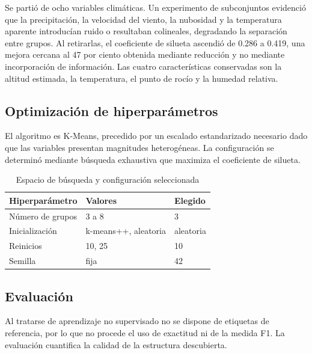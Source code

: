 \documentclass[conference]{IEEEtran}
\begin{document}
Se parti\'o de ocho variables clim\'aticas. Un experimento de subconjuntos
evidenci\'o que la precipitaci\'on, la velocidad del viento, la nubosidad y la
temperatura aparente introduc\'ian ruido o resultaban colineales, degradando la
separaci\'on entre grupos. Al retirarlas, el coeficiente de silueta ascendi\'o
de 0.286 a 0.419, una mejora cercana al 47 por ciento obtenida mediante
reducci\'on y no mediante incorporaci\'on de informaci\'on. Las cuatro
caracter\'isticas conservadas son la altitud estimada, la temperatura, el punto
de roc\'io y la humedad relativa.

\subsection{Optimizaci\'on de hiperpar\'ametros}

El algoritmo es K-Means, precedido por un escalado estandarizado necesario dado
que las variables presentan magnitudes heterog\'eneas. La configuraci\'on se
determin\'o mediante b\'usqueda exhaustiva que maximiza el coeficiente de
silueta.

\begin{table}[htbp]
\caption{Espacio de b\'usqueda y configuraci\'on seleccionada}
\begin{center}
\begin{tabular}{@{}lll@{}}
\toprule
\textbf{Hiperpar\'ametro} & \textbf{Valores} & \textbf{Elegido} \\
\midrule
N\'umero de grupos & 3 a 8 & 3 \\
Inicializaci\'on & k-means++, aleatoria & aleatoria \\
Reinicios & 10, 25 & 10 \\
Semilla & fija & 42 \\
\bottomrule
\end{tabular}
\label{tab:hiperparametros}
\end{center}
\end{table}

\subsection{Evaluaci\'on}

Al tratarse de aprendizaje no supervisado no se dispone de etiquetas de
referencia, por lo que no procede el uso de exactitud ni de la medida F1. La
evaluaci\'on cuantifica la calidad de la estructura descubierta.
\end{document}
